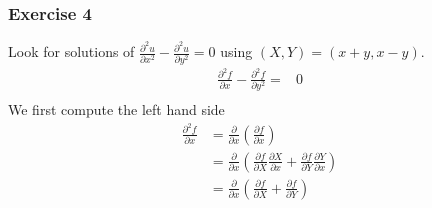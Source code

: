 \subsubsection{Exercise 4}
Look for solutions of $ \frac{ \partial ^2 u  }{ \partial x ^2 } - \frac{ \partial ^2 u }{
\partial y^2 } = 0  $ using $ \left( X, Y\right) = \left( x+y,
x-y\right) . $
\begin{align*}
    \frac{ \partial ^2 f }{ \partial x } - \frac{ \partial^2 f }{ \partial y^2 } = &0\\
\end{align*}
We first compute the left hand side
\begin{align*}
    \frac{ \partial ^2 f  }{ \partial x } &= \frac{ \partial  }{ \partial x } \left(
    \frac{ \partial f }{ \partial x } \right) \\
     &= \frac{ \partial  }{ \partial x } \left( \frac{ \partial f }{ \partial X } \frac{
     \partial X }{ \partial x } + \frac{ \partial f }{ \partial Y } \frac{ \partial Y }{
     \partial x } \right)  \\ 
      &= \frac{ \partial  }{ \partial x } \left( \frac{ \partial f }{ \partial X } +
      \frac{ \partial f }{ \partial Y } \right)  \\ 
\end{align*}

